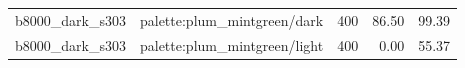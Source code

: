 \begin{longtable}{l>{\raggedright\arraybackslash}p{.42\linewidth}rrr}
b8000\_\allowbreak{}dark\_\allowbreak{}s303 & %
palette:plum\_\allowbreak{}mintgreen/dark & %
400 & %
86.50 & %
99.39 \\ %

b8000\_\allowbreak{}dark\_\allowbreak{}s303 & %
palette:plum\_\allowbreak{}mintgreen/light & %
400 & %
0.00 & %
55.37 \\ %


\end{longtable}
